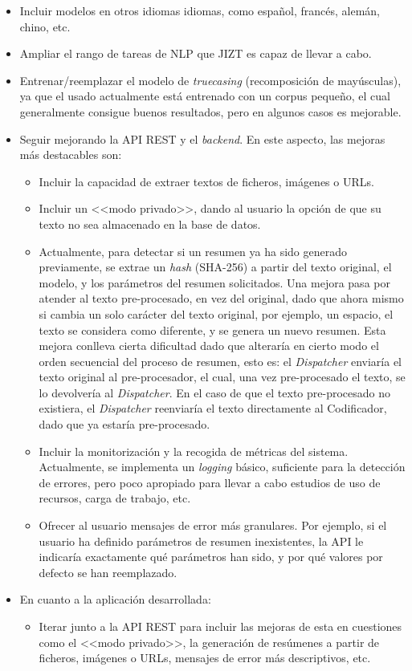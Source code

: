 \vspace{-0.3cm}
\begin{itemize}[\textbullet]
	\item Incluir modelos en otros idiomas idiomas, como español, francés, alemán, chino, etc.
	\item Ampliar el rango de tareas de NLP que JIZT es capaz de llevar a cabo.
	\item Entrenar/reemplazar el modelo de \emph{truecasing} (recomposición de mayúsculas), ya que el usado actualmente está entrenado con un corpus pequeño, el cual generalmente consigue buenos resultados, pero en algunos casos es mejorable.
	\item Seguir mejorando la API REST y el \emph{backend}. En este aspecto, las mejoras más destacables son:
	\begin{itemize}[◦]
		\item Incluir la capacidad de extraer textos de ficheros, imágenes o URLs.
		
		\item Incluir un <<modo privado>>, dando al usuario la opción de que su texto no sea almacenado en la base de datos.
		
		\item Actualmente, para detectar si un resumen ya ha sido generado previamente, se extrae un \emph{hash} (SHA-256) a partir del texto original, el modelo, y los parámetros del resumen solicitados. Una mejora pasa por atender al texto pre-procesado, en vez del original, dado que ahora mismo si cambia un solo carácter del texto original, por ejemplo, un espacio, el texto se considera como diferente, y se genera un nuevo resumen. Esta mejora conlleva cierta dificultad dado que alteraría en cierto modo el orden secuencial del proceso de resumen, esto es: el \emph{Dispatcher} enviaría el texto original al pre-procesador, el cual, una vez pre-procesado el texto, se lo devolvería al \emph{Dispatcher}. En el caso de que el texto pre-procesado no existiera, el \emph{Dispatcher} reenviaría el texto directamente al Codificador, dado que ya estaría pre-procesado.
		
		\item Incluir la monitorización y la recogida de métricas del sistema. Actualmente, se implementa un \emph{logging} básico, suficiente para la detección de errores, pero poco apropiado para llevar a cabo estudios de uso de recursos, carga de trabajo, etc.
		
		\item Ofrecer al usuario mensajes de error más granulares. Por ejemplo, si el usuario ha definido parámetros de resumen inexistentes, la API le indicaría exactamente qué parámetros han sido, y por qué valores por defecto se han reemplazado.
	\end{itemize}
	\item En cuanto a la aplicación desarrollada:
	\begin{itemize}[◦]
		\item Iterar junto a la API REST para incluir las mejoras de esta en cuestiones como el <<modo privado>>, la generación de resúmenes a partir de ficheros, imágenes o URLs, mensajes de error más descriptivos, etc.
		

\end{itemize}
\end{itemize}
